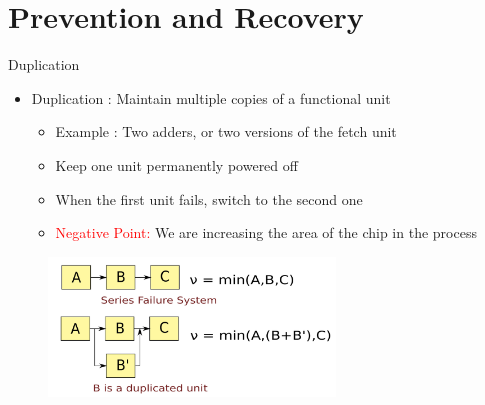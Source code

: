 \documentclass[xcolor=pdftex,dvipsnames,table,svgnames,x11names]{beamer}
\begin{document}
\section{Prevention and Recovery}

\begin{frame}{Duplication}
 \begin{itemize}
  \item Duplication : Maintain multiple copies of a functional unit 
    \begin{itemize}
      \item Example : Two adders, or two versions of the fetch unit
      \item Keep one unit permanently powered off
      \item When the first unit fails, switch to the second one
      \item \textcolor{red}{Negative Point: } We are increasing the area of the chip in the process
    \end{itemize}
 \end{itemize}
\begin{center}
\begin{figure}[h]
 \includegraphics[width=3in]{map1}
\end{figure}
\end{center}

\end{frame}
\end{document}
